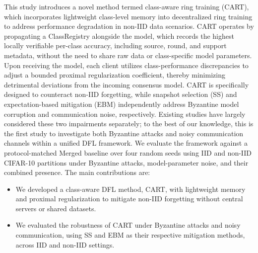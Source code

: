 \documentclass[conference]{IEEEtran}
\begin{document}
This study introduces a novel method termed class-aware ring training (CART), which incorporates lightweight class-level memory into decentralized ring training to address performance degradation in non-IID data scenarios. CART operates by propagating a ClassRegistry alongside the model, which records the highest locally verifiable per-class accuracy, including source, round, and support metadata, without the need to share raw data or class-specific model parameters. Upon receiving the model, each client utilizes class-performance discrepancies to adjust a bounded proximal regularization coefficient, thereby minimizing detrimental deviations from the incoming consensus model. CART is specifically designed to counteract non-IID forgetting, while snapshot selection (SS) \cite{basil} and expectation-based mitigation (EBM) \cite{NoiseComm} independently address Byzantine model corruption and communication noise, respectively. Existing studies have largely considered these two impairments separately; to the best of our knowledge, this is the first study to investigate both Byzantine attacks and noisy communication channels within a unified DFL framework. We evaluate the framework against a protocol-matched Merged baseline over four random seeds using IID and non-IID CIFAR-10 partitions under Byzantine attacks, model-parameter noise, and their combined presence. The main contributions are:
\begin{itemize}
    \item We developed a class-aware DFL method, CART, with lightweight memory and proximal regularization to mitigate non-IID forgetting without central servers or shared datasets.
    \item We evaluated the robustness of CART under Byzantine attacks and noisy communication, using SS and EBM as their respective mitigation methods, across IID and non-IID settings.
\end{itemize}
\end{document}
